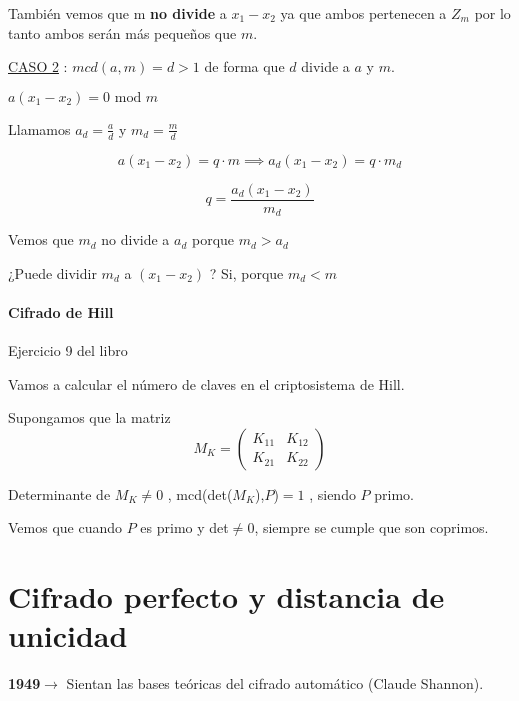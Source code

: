 \begin{enumerate}
\begin{problem}[5]
		También vemos que m \textbf{no divide} a $x_1 - x_2$ ya que ambos pertenecen a $Z_m$ por lo tanto ambos serán más pequeños que $m$.
		
		
		
		\underline{CASO 2} : $mcd(a,m) = d > 1$ de forma que $d$ divide a $a$ y $m$.
		
		$a(x_1 - x_2) = 0 \text{ mod } m$
		
		Llamamos $a_d = \frac{a}{d}$ y $m_d = \frac{m}{d}$
		
			$$a(x_1 - x_2) = q \cdot m \implies a_d(x_1 - x_2) = q \cdot m_d$$
			
			$$q = \frac{a_d(x_1 -x_2)}{m_d}$$
			
			Vemos que $m_d$ no divide a $a_d$ porque $m_d > a_d$
			
			¿Puede dividir $m_d$ a $(x_1-x_2)$ ?  Si, porque $m_d <m$
		
	\end{problem}
	
\end{enumerate}
 \subsubsection{Cifrado de Hill}
 
 \begin{problem} Ejercicio 9 del libro
 	
 	Vamos a calcular el número de claves en el criptosistema de Hill.
 	
 	Supongamos que la matriz
 	$$M_K = ( \begin{matrix}
 	K_{11} & K_{12}\\
 	K_{21} & K_{22}
 	\end{matrix} ) $$
 	
 	Determinante de $M_K \neq 0$ , mcd(det($M_K$),$P$)$= 1$ , siendo $P$ primo.
 	\solution
 	
 	Vemos que cuando $P$ es primo y det$\neq 0$, siempre se cumple que son coprimos.
 	
 	
 	
 \end{problem}
 
 
 \chapter{Cifrado perfecto y distancia de unicidad}
 
 \textbf{1949}$\rightarrow$ Sientan las bases teóricas del cifrado automático (Claude Shannon).
 
